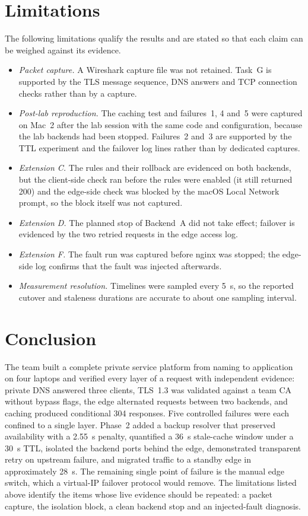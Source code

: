 \documentclass[conference,a4paper]{IEEEtran}
\begin{document}
\section{Limitations}
\label{sec:limits}
The following limitations qualify the results and are stated so that each claim can be weighed
against its evidence.
\begin{itemize}
\item \emph{Packet capture.} A Wireshark capture file was not retained. Task~G is supported by
the TLS message sequence, DNS answers and TCP connection checks rather than by a capture.
\item \emph{Post-lab reproduction.} The caching test and failures~1, 4 and~5 were captured on
Mac~2 after the lab session with the same code and configuration, because the lab backends had
been stopped. Failures~2 and~3 are supported by the TTL experiment and the failover log lines
rather than by dedicated captures.
\item \emph{Extension C.} The rules and their rollback are evidenced on both backends, but the
client-side check ran before the rules were enabled (it still returned 200) and the edge-side
check was blocked by the macOS Local Network prompt, so the block itself was not captured.
\item \emph{Extension D.} The planned stop of Backend~A did not take effect; failover is evidenced
by the two retried requests in the edge access log.
\item \emph{Extension F.} The fault run was captured before nginx was stopped; the edge-side log
confirms that the fault was injected afterwards.
\item \emph{Measurement resolution.} Timelines were sampled every 5~s, so the reported cutover
and staleness durations are accurate to about one sampling interval.
\end{itemize}

\section{Conclusion}
The team built a complete private service platform from naming to application on four laptops and
verified every layer of a request with independent evidence: private DNS answered three clients,
TLS~1.3 was validated against a team CA without bypass flags, the edge alternated requests between
two backends, and caching produced conditional 304 responses. Five controlled failures were each
confined to a single layer. Phase~2 added a backup resolver that preserved availability with a
2.55~s penalty, quantified a 36~s stale-cache window under a 30~s TTL, isolated the backend ports
behind the edge, demonstrated transparent retry on upstream failure, and migrated traffic to a
standby edge in approximately 28~s. The remaining single point of failure is the manual edge
switch, which a virtual-IP failover protocol would remove. The limitations listed above identify
the items whose live evidence should be repeated: a packet capture, the isolation block, a clean
backend stop and an injected-fault diagnosis.
\end{document}
